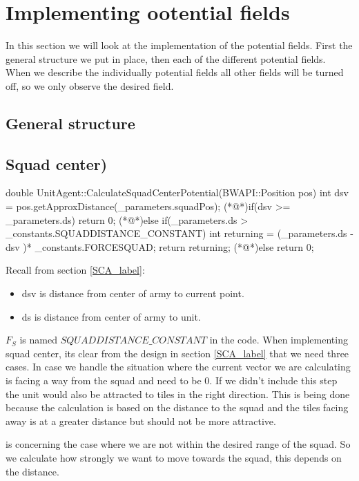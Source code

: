 \section{Implementing ootential fields}
	In this section we will look at the implementation of the potential fields.
	First the general structure we put in place, then each of the different potential fields. When we describe the individually potential fields all other fields will be turned off, so we only observe the desired field.
	
	\subsection{General structure}
	
	
	
	\subsection{Squad center)}	
		\begin{Sourcecode}[caption=Squad center]
double UnitAgent::CalculateSquadCenterPotential(BWAPI::Position pos)
{
	int dsv = pos.getApproxDistance(_parameters.squadPos);
	(*@\lnote@*)if(dsv >= _parameters.ds){	return 0;	}
	(*@\lnote@*)else if(_parameters.ds > _constants.SQUADDISTANCE_CONSTANT)
	{
		int returning = (_parameters.ds - dsv )* _constants.FORCESQUAD;
		return returning;
	}
	(*@\lnote@*)else{	return 0;	}
}
\end{Sourcecode}

		Recall from section \ref{SCA_label}:
		\begin{itemize}
			\item  dsv is distance from center of army to current point.
			\item  ds is distance from center of army to unit.
		\end{itemize}
		$F_{S}$ is named $SQUADDISTANCE\_CONSTANT$ in the code.
		When implementing squad center, its clear from the design in section \ref{SCA_label} that we need three cases. 
		In case  we handle the situation where the current vector we are calculating is facing a way from the squad and need to be 0. If we didn't include this step the unit would also be attracted to tiles in the right direction. This is being done because the calculation is based on the distance to the squad and the tiles facing away is at a greater distance but should not be more attractive.
		
		 is concerning the case where we are not within the desired range of the squad. So we calculate how strongly we want to move towards the squad, this depends on the distance. 
		
